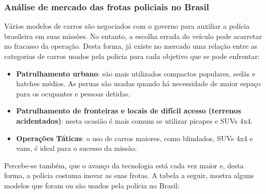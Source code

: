 \subsubsection{Análise de mercado das frotas policiais no Brasil}

Vários modelos de carros são negociados com o governo para auxiliar a polícia brasileira em suas missões. No entanto, a escolha errada do veículo pode acarretar no fracasso da operação. Desta forma, já existe no mercado uma relação entre as categorias de carros usados pela policia para cada objetivo que se pode enfrentar:

\begin{itemize}
\item \textbf{Patrulhamento urbano}: são mais utilizados compactos populares, sedãs e hatches médios. As peruas são usadas quando há necessidade de maior espaço para os ocupantes e pessoas detidas.
\item \textbf{Patrulhamento de fronteiras e locais de difícil acesso (terrenos acidentados)}: nesta ocasião é mais comum se utilizar picapes e SUVs 4x4.
\item \textbf{Operações Táticas}: o uso de carros maiores, como blindados, SUVs 4x4 e vans, é ideal para o sucesso da missão.\cite{frotas2013}
\end{itemize}

Percebe-se também, que o avanço da tecnologia está cada vez maior e, desta forma, a polícia costuma inovar as suas frotas. A tabela a seguir, mostra alguns modelos que foram ou são usados pela polícia no Brasil:

